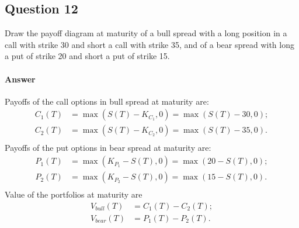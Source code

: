 
\subsection{Question 12}
Draw the payoff diagram at maturity of a bull spread with a long position in a
    call with strike 30 and short a call with strike 35, and of a bear spread
    with long a put of strike 20 and short a put of strike 15.

\paragraph{Answer}
Payoffs of the call options in bull spread at maturity are:
\begin{align*}
    C_1(T) &= \max (S(T) - K_{C_1}, 0) = \max (S(T) - 30, 0); \\
    C_2(T) &= \max (S(T) - K_{C_2}, 0) = \max (S(T) - 35, 0). \\
\end{align*}
Payoffs of the put options in bear spread at maturity are:
\begin{align*}
    P_1(T) &= \max (K_{P_1} - S(T), 0) = \max (20 - S(T), 0); \\
    P_2(T) &= \max (K_{P_2} - S(T), 0) = \max (15 - S(T), 0). \\
\end{align*}
Value of the portfolios at maturity are
\begin{align*}
    V_{bull}(T) &= C_1(T) - C_2(T); \\
    V_{bear}(T) &= P_1(T) - P_2(T). \\
\end{align*}

